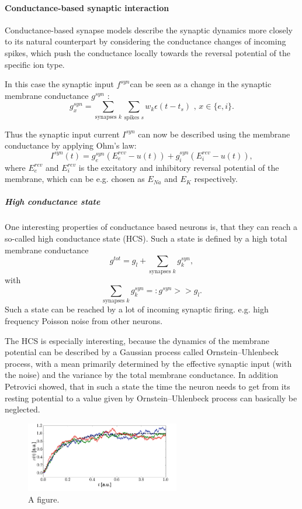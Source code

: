 \paragraph{Conductance-based synaptic interaction} Conductance-based synapse models describe the synaptic dynamics more closely to its natural counterpart by considering the conductance changes of incoming spikes, which push the conductance locally towards the reversal potential of the specific ion type. 

In this case the synaptic input $f^{syn} $can be seen as a change in the synaptic membrane conductance $g^{syn}$ :
\[
g_x^{syn} = \sum_{\text{synapses } k } \sum_{\text{spikes } s} w_k \epsilon(t - t_s) \text{ ,      } x \in \{e, i\}.
\]

Thus the synaptic input current $I^{syn}$ can now be described using the membrane conductance by applying Ohm's law:
\[
I^{syn}(t) = g_e^{syn} (E_e^{rev} - u(t)) + g_i^{syn} (E_i^{rev} - u(t)),
\]
where $E_e^{rev}$ and $E_i^{rev}$ is the excitatory and inhibitory reversal potential of the membrane, which can be e.g. chosen as $E_{Na}$ and $E_{K}$ respectively.  

\subparagraph{High conductance state} One interesting properties of conductance based neurons is, that they can reach a so-called high conductance state (HCS). Such a state is defined by a high total membrane conductance 
\[
g^{tot} = g_l + \sum_{\text{synapses } k} g_k^{syn},
\]
with 
\[
\sum_{\text{synapses } k} g_k^{syn} =: g^{syn} >> g_l .
\]
Such a state can be reached by a lot of incoming synaptic firing. e.g. high frequency Poisson noise from other neurons. 

The HCS is especially interesting, because the dynamics of the membrane potential can be described by a Gaussian process called Ornstein–Uhlenbeck process, with a mean primarily determined by the effective synaptic input (with the noise) and the variance by the total membrane conductance.
In addition Petrovici showed, that in such a state the time the neuron needs to get from its resting potential to a value given by Ornstein–Uhlenbeck process can basically be neglected.

\begin{figure}
	\centering
    	\includegraphics[width=0.6\textwidth]{imgs/orn_uhl_process.png} 
    \caption{A figure.}
	\label{fig:test}
\end{figure}


